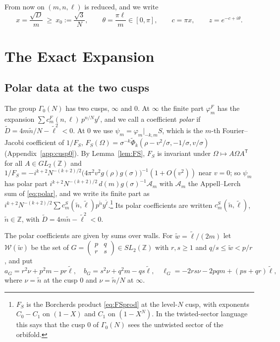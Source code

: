 \documentclass[11pt]{amsart}
\numberwithin{equation}{section}
\theoremstyle{plain}
\theoremstyle{definition}
\theoremstyle{remark}
\newcommand{\Z}{\mathbb{Z}}
\newcommand{\cA}{\mathcal{A}}
\newcommand{\tPhi}{\widetilde{\Phi}}
\newcommand{\sm}[4]{\left(\begin{smallmatrix}#1&#2\\#3&#4\end{smallmatrix}\right)}
\begin{document}
From now on $(m,n,\ell)$ is reduced, and we write
\begin{equation}\label{eq:xtheta}
x=\frac{\sqrt D}{m}\ \ge\ x_0:=\frac{\sqrt3}{N},\qquad \theta=\frac{\pi\ell}{m}\in[0,\pi],\qquad c=\pi x,\qquad z=e^{-c+i\theta}.
\end{equation}

\section{The Exact Expansion}\label{sec:exp}

\subsection{Polar data at the two cusps}
The group $\Gamma_0(N)$ has two cusps, $\infty$ and $0$. At $\infty$ the finite part $\varphi^F_m$ has the expansion $\sum c^F_m(n,\ell)\,p^{n/N}y^\ell$, and we call a coefficient \emph{polar} if $\tilde D=4m\tilde n/N-\tilde\ell^2<0$. At $0$ we use $\psi_m=\varphi_m|_{-k,m}S$, which is the $m$-th Fourier--Jacobi coefficient of $1/F_S$, $F_S(\Omega)=\sigma^{-k}\tPhi_k(\rho-v^2/\sigma,-1/\sigma,v/\sigma)$ (Appendix~\ref{app:cusp0}). By Lemma~\ref{lem:FS}, $F_S$ is invariant under $\Omega\mapsto A\Omega A^{\mathsf T}$ for all $A\in GL_2(\Z)$ and $1/F_S=-i^{k+2}N^{-(k+2)/2}\bigl(4\pi^2v^2g(\rho)g(\sigma)\bigr)^{-1}(1+O(v^2))$ near $v=0$; so $\psi_m$ has polar part $i^{k+2}N^{-(k+2)/2}\,d(m)g(\sigma)^{-1}\cA_m$ with $\cA_m$ the Appell--Lerch sum of \eqref{eq:polar}, and we write its finite part as $i^{k+2}N^{-(k+2)/2}\sum c^S_m(\tilde n,\tilde\ell)p^{\tilde n}y^{\tilde\ell}$.\footnote{$F_S$ is the Borcherds product \eqref{eq:FSprod} at the level-$N$ cusp, with exponents $C_0-C_1$ on $(1-X)$ and $C_1$ on $(1-X^N)$. In the twisted-sector language this says that the cusp $0$ of $\Gamma_0(N)$ sees the untwisted sector of the orbifold.} Its polar coefficients are written $c^{S}_m(\tilde n,\tilde\ell)$, $\tilde n\in\Z$, with $\tilde D=4m\tilde n-\tilde\ell^2<0$.

The polar coefficients are given by sums over walls. For $\tilde w=\tilde\ell/(2m)$ let $\mathcal W(\tilde w)$ be the set of $G=\sm pqrs\in SL_2(\Z)$ with $r,s\ge1$ and $q/s\le\tilde w<p/r$, and put
\begin{equation}\label{eq:mG}
a_G=r^2\nu+p^2m-pr\tilde\ell,\quad b_G=s^2\nu+q^2m-qs\tilde\ell,\quad \ell_G=-2rs\nu-2pqm+(ps+qr)\tilde\ell,
\end{equation}
where $\nu=\tilde n$ at the cusp $0$ and $\nu=\tilde n/N$ at $\infty$.
\end{document}

